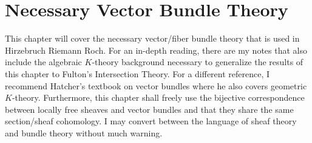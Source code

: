 \documentclass{ut-thesis}
\newcommand{\C}{{\mathbb{C}}}
\begin{document}







%



%
%
%
%
%
%

\chapter{Necessary Vector Bundle Theory}\label{cha:characteristicClass}

This chapter will cover the necessary vector/fiber bundle theory that is used in Hirzebruch Riemann Roch. For
an in-depth reading, there are my notes \cite{NateKTheory} that also include the algebraic $K$-theory
background necessary to generalize the results of this chapter to Fulton's Intersection Theory. For
a different reference, I recommend Hatcher's textbook on vector bundles \cite{hatcherVectorBundlesKTheory2017}
where he also covers geometric $K$-theory. Furthermore, this chapter shall freely use the bijective
correspondence between locally free sheaves and vector bundles and that they share the same section/sheaf
cohomology. I may convert between the language of sheaf theory and bundle theory without much warning.
\end{document}
